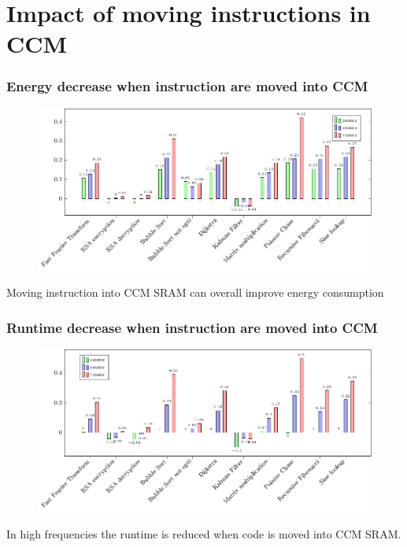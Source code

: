 \documentclass[
	11pt, %
]{beamer}
\begin{document}
\section{Impact of moving instructions in CCM}
\begin{frame}
	\frametitle{Energy decrease when instruction are moved into CCM}
	\begin{figure}
		\centering
        \includegraphics[scale=0.7]{plot/code_ccm_energy.pdf}
	\end{figure}
	Moving instruction into CCM SRAM can overall improve energy consumption 
\end{frame}

\begin{frame}
	\frametitle{Runtime decrease when instruction are moved into CCM}
	\begin{figure}
		\centering
        \includegraphics[scale=0.7]{plot/code_ccm_runtime.pdf}
	\end{figure}
	In high frequencies the runtime is reduced when code is moved into CCM SRAM.
\end{frame}
\end{document}
